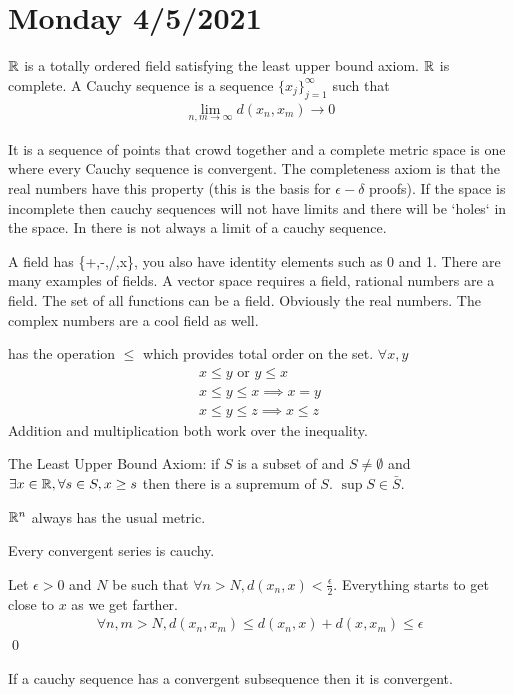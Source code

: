 \documentclass{article}
\begin{document}
  \section{Monday  4/5/2021}
  $\mathbb{R}$ is a totally ordered field satisfying the least upper bound axiom. $\mathbb{R}$ is complete. A Cauchy sequence is a sequence $ \{x_j\}_{j=1}^\infty$ such that
  \begin{align*}
    \lim_{n,m\to\infty}d(x_n,x_m)\to0
  \end{align*}

  It is a sequence of points that crowd together and a complete metric space is one where every Cauchy sequence is convergent. The completeness axiom is that the real numbers have this property (this is the basis for $\epsilon-\delta$ proofs). If the space is incomplete then cauchy sequences will not have limits and there will be `holes` in the space. In \Q there is not always a limit of a cauchy sequence.\par
  A field has \{+,-,/,x\}, you also have identity elements such as 0 and 1. There are many examples of fields. A vector space requires a field, rational numbers are a field. The set of all functions can be a field. Obviously the real numbers. The complex numbers are a cool field as well.\par
  \R has the operation $\leq$ which provides total order on the set. $\forall x,y$
  \begin{align*}
    x\leq y\text{ or }y\leq x\\
    x\leq y\leq x\implies x=y\\
    x\leq y\leq z\implies x\leq z
  \end{align*}
  Addition and multiplication both work over the inequality.\par
  The Least Upper Bound Axiom: if $S$ is a subset of \R\:and $S\neq\emptyset$ and $\exists x\in \mathbb{R}, \forall s\in S, x\geq s$ then there is a supremum of $S$. $\sup S\in \bar{S}$.\par
  $\mathbb{R}^n$ always has the usual metric. \begin{theorem}
    Every convergent series is cauchy.
  \end{theorem}
  Let $\epsilon>0$ and $N$ be such that $\forall n>N,d(x_n,x)< \frac{\epsilon}{2}$. Everything starts to get close to $x$ as we get farther.
  \begin{align*}
    \forall n,m>N, d(x_n,x_m)\leq d(x_n,x)+d(x,x_m)\leq \epsilon
  \end{align*}
  \qed
  \begin{theorem}
    If a cauchy sequence has a convergent subsequence then it is convergent.
  \end{theorem}
\end{document}
